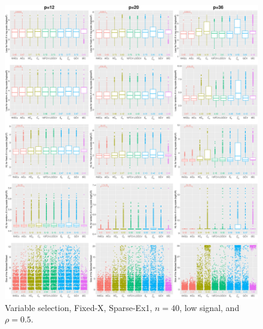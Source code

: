 \begin{figure}[!ht]
\centering
\includegraphics[width=\textwidth]{figures/supplement/fixedx/subset_selection/Sparse-Ex1_n40_lsnr_rho05.eps}
\caption{Variable selection, Fixed-X, Sparse-Ex1, $n=40$, low signal, and $\rho=0.5$.}
\end{figure}
\clearpage
